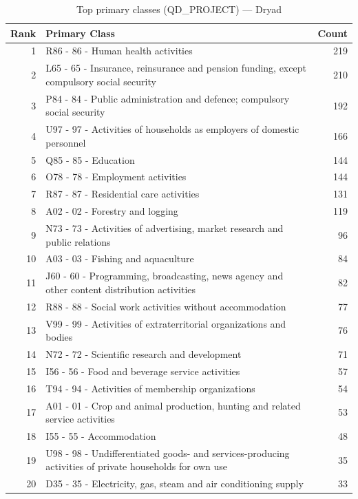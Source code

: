 \begin{table}[H]
    \centering
    \begin{tabular}{r p{10cm} r}
    \hline
    \textbf{Rank} & \textbf{Primary Class} & \textbf{Count} \\
    \hline
    1 & R86 - 86 - Human health activities & 219 \\
    2 & L65 - 65 - Insurance, reinsurance and pension funding, except compulsory social security & 210 \\
    3 & P84 - 84 - Public administration and defence; compulsory social security & 192 \\
    4 & U97 - 97 - Activities of households as employers of domestic personnel & 166 \\
    5 & Q85 - 85 - Education & 144 \\
    6 & O78 - 78 - Employment activities & 144 \\
    7 & R87 - 87 - Residential care activities & 131 \\
    8 & A02 - 02 - Forestry and logging & 119 \\
    9 & N73 - 73 - Activities of advertising, market research and public relations & 96 \\
    10 & A03 - 03 - Fishing and aquaculture & 84 \\
    11 & J60 - 60 - Programming, broadcasting, news agency and other content distribution activities & 82 \\
    12 & R88 - 88 - Social work activities without accommodation & 77 \\
    13 & V99 - 99 - Activities of extraterritorial organizations and bodies & 76 \\
    14 & N72 - 72 - Scientific research and development & 71 \\
    15 & I56 - 56 - Food and beverage service activities & 57 \\
    16 & T94 - 94 - Activities of membership organizations & 54 \\
    17 & A01 - 01 - Crop and animal production, hunting and related service activities & 53 \\
    18 & I55 - 55 - Accommodation & 48 \\
    19 & U98 - 98 - Undifferentiated goods- and services-producing activities of private households for own use & 35 \\
    20 & D35 - 35 - Electricity, gas, steam and air conditioning supply & 33 \\
    \hline
    \end{tabular}
    \caption{Top primary classes (QD\_PROJECT) --- Dryad}
\end{table}

